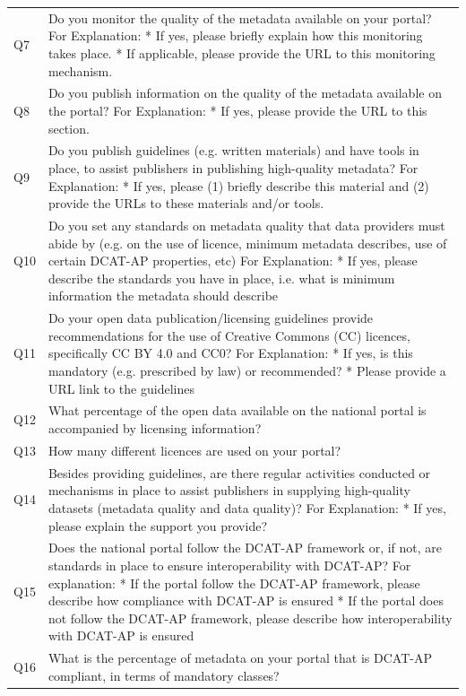 {\begin{longtable}[]{@{}
  L{0.1386}
  L{0.8614}@{}}
Q7 & Do you monitor the quality of the metadata available on your portal? For Explanation: * If yes, please briefly explain how this monitoring takes place. * If applicable, please provide the URL to this monitoring mechanism. \\
Q8 & Do you publish information on the quality of the metadata available on the portal? For Explanation: * If yes, please provide the URL to this section. \\
Q9 & Do you publish guidelines (e.g. written materials) and have tools in place, to assist publishers in publishing high-quality metadata? For Explanation: * If yes, please (1) briefly describe this material and (2) provide the URLs to these materials and/or tools. \\
Q10 & Do you set any standards on metadata quality that data providers must abide by (e.g. on the use of licence, minimum metadata describes, use of certain DCAT-AP properties, etc) For Explanation: * If yes, please describe the standards you have in place, i.e. what is minimum information the metadata should describe \\
Q11 & Do your open data publication/licensing guidelines provide recommendations for the use of Creative Commons (CC) licences, specifically CC BY 4.0 and CC0? For Explanation: * If yes, is this mandatory (e.g. prescribed by law) or recommended? * Please provide a URL link to the guidelines \\
Q12 & What percentage of the open data available on the national portal is accompanied by licensing information? \\
Q13 & How many different licences are used on your portal? \\
Q14 & Besides providing guidelines, are there regular activities conducted or mechanisms in place to assist publishers in supplying high-quality datasets (metadata quality and data quality)? For Explanation: * If yes, please explain the support you provide? \\
Q15 & Does the national portal follow the DCAT-AP framework or, if not, are standards in place to ensure interoperability with DCAT-AP? For explanation: * If the portal follow the DCAT-AP framework, please describe how compliance with DCAT-AP is ensured * If the portal does not follow the DCAT-AP framework, please describe how interoperability with DCAT-AP is ensured \\
Q16 & What is the percentage of metadata on your portal that is DCAT-AP compliant, in terms of mandatory classes? \\

\end{longtable}}
